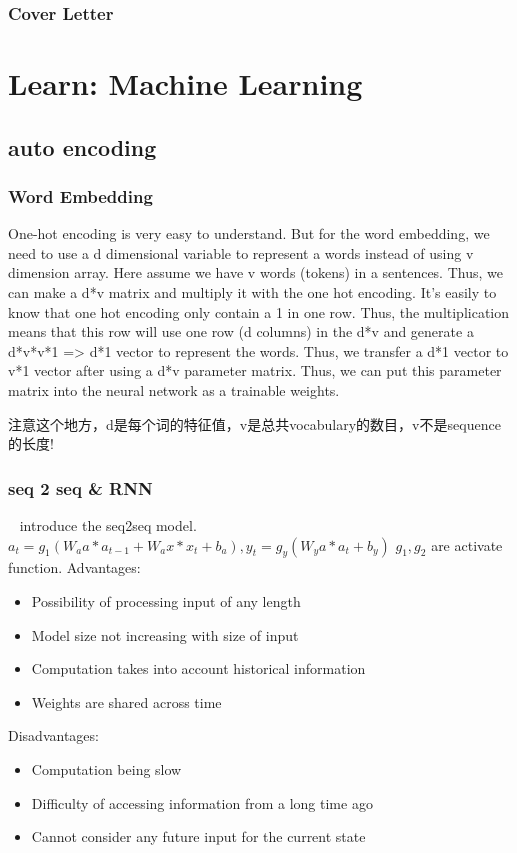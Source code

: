 \documentclass[UTF8]{article}
\begin{document}
\subsubsection{Cover Letter}
\section{Learn: Machine Learning}
\subsection{auto encoding}
\subsubsection{Word Embedding}
One-hot encoding is very easy to understand. But for the word embedding, we need to use a d dimensional variable to represent a words instead of using v dimension array. Here assume we have v words (tokens) in a sentences. Thus, we can make a d*v matrix and multiply it with the one hot encoding. It's easily to know that one hot encoding only contain a 1 in one row. Thus, the multiplication means that this row will use one row (d columns) in the d*v and generate a d*v*v*1 => d*1 vector to represent the words. Thus, we transfer a d*1 vector to v*1 vector after using a d*v parameter matrix. Thus, we can put this parameter matrix into the neural network as a trainable weights.

注意这个地方，d是每个词的特征值，v是总共vocabulary的数目，v不是sequence的长度!
\subsubsection{seq 2 seq \& RNN}
~\cite{sutskever2014sequence} introduce the seq2seq model. 
$a_t = g_1(W_aa*a_{t-1} + W_ax*x_{t} + b_a), y_t = g_y(W_ya*a_{t} + b_y)$ $g_1,g_2$ are activate function. 
Advantages:\\
\begin{itemize}
    \item Possibility of processing input of any length
    \item Model size not increasing with size of input
    \item Computation takes into account historical information
    \item Weights are shared across time
\end{itemize}

Disadvantages:\\
\begin{itemize}
    \item Computation being slow
    \item Difficulty of accessing information from a long time ago
    \item Cannot consider any future input for the current state
\end{itemize}
\end{document}
